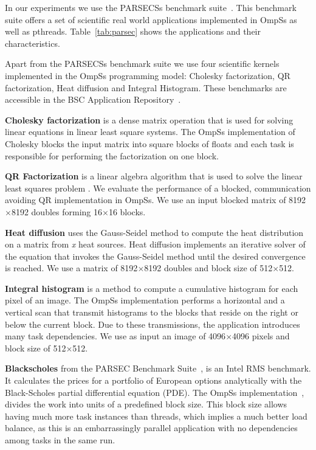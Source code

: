 In our experiments we use the PARSECSs benchmark suite~\cite{Chasapis:TACO2016}.
This benchmark suite offers a set of scientific real world applications implemented in OmpSs as well as pthreads. 
Table~\ref{tab:parsec} shows the applications and their characteristics.

Apart from the PARSECSs benchmark suite we use four scientific kernels implemented in the OmpSs programming model: Cholesky factorization, QR factorization, Heat diffusion and Integral Histogram. These benchmarks are accessible in the BSC Application Repository~\cite{BAR}. 

\textbf{Cholesky factorization} is a dense matrix operation that is used for solving linear equations in linear least square systems.
The OmpSs implementation of Cholesky blocks the input matrix into square blocks of floats and each task is responsible for performing the factorization on one block.

\textbf{QR Factorization} is a linear algebra algorithm that is used to solve the linear least squares problem \cite{QR}. 
We evaluate the performance of a blocked, communication avoiding QR implementation in OmpSs. 
We use an input blocked matrix of 8192$\times$8192 doubles forming 16$\times$16 blocks.

\textbf{Heat diffusion} uses the Gauss-Seidel method to compute the heat distribution on a matrix from \textit{x} heat sources. Heat diffusion implements an iterative solver of the equation that invokes the Gauss-Seidel method until the desired convergence is reached. We use a matrix of 8192$\times$8192 doubles and block size of 512$\times$512.

\textbf{Integral histogram} is a method to compute a cumulative histogram for each pixel of an image. 
The OmpSs implementation performs 
a horizontal and a vertical scan that transmit histograms to the blocks that reside on the right or below the current block.
Due to these transmissions, the application introduces many task dependencies. We use as input an image of 4096$\times$4096 pixels and block size of 512$\times$512.

\textbf{Blackscholes} from the PARSEC Benchmark Suite~\cite{Bienia:PhD2011}, is an Intel RMS benchmark. It calculates the prices for a portfolio of European options analytically with the Black-Scholes partial differential equation (PDE).
The OmpSs implementation~\cite{AbstrLevels_TACO12}, divides the work into units of a predefined block size. 
This block size allows having much more task instances than threads, which implies a much better load balance, as this is an embarrassingly parallel application with no dependencies among tasks in the same run.


